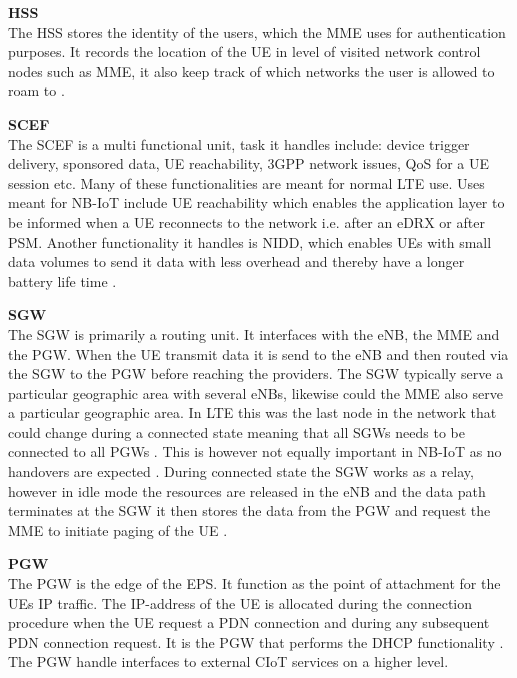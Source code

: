 \textbf{\gls{HSS}}\\
The \gls{HSS} stores the identity of the users, which the \gls{MME} uses for authentication purposes. It records the location of the \gls{UE} in level of visited network control nodes  such as \gls{MME}, it also keep track of which networks the user is allowed to roam to \citep[ch. 3]{book_LTE_for_UMTS}.

\textbf{\gls{SCEF}}\\
The \gls{SCEF} is a multi functional unit, task it handles include: device trigger delivery, sponsored data, \gls{UE} reachability, \gls{3GPP} network issues, \gls{QoS} for a \gls{UE} session etc. Many of these functionalities are meant for normal \gls{LTE} use. Uses meant for \gls{NB-IoT} include \gls{UE} reachability which enables the application layer to be informed when a \gls{UE} reconnects to the network i.e. after an \gls{eDRX} or after \gls{PSM}. Another functionality it handles is \gls{NIDD}, which enables \gls{UE}s with small data volumes to send it data with less overhead and thereby have a longer battery life time .

\textbf{\gls{SGW}}\\
The \gls{SGW} is primarily a routing unit. It interfaces with the \gls{eNB}, the \gls{MME} and the \gls{PGW}. When the \gls{UE} transmit data it is send to the \gls{eNB} and then routed via the \gls{SGW} to the \gls{PGW} before reaching the providers. The \gls{SGW} typically serve a particular geographic area with several \gls{eNB}s, likewise could the \gls{MME} also serve a particular geographic area. In \gls{LTE} this was the last node in the network that could change during a connected state meaning that all \gls{SGW}s needs to be connected to all \gls{PGW}s \citep[ch. 3]{book_LTE_for_UMTS}. This is however not equally important in \gls{NB-IoT} as no handovers are expected \citep{REL-13}. During connected state the \gls{SGW} works as a relay, however in idle mode the resources are released in the \gls{eNB} and the data path terminates at the \gls{SGW} it then stores the data from the \gls{PGW} and request the \gls{MME} to initiate paging of the \gls{UE} \citep[ch. 3]{book_LTE_for_UMTS}.

\textbf{\gls{PGW}}\\
The \gls{PGW} is the edge of the \gls{EPS}. It function as the point of attachment for the \gls{UE}s \gls{IP} traffic. The \gls{IP}-address of the \gls{UE} is allocated during the connection procedure when the \gls{UE} request a \gls{PDN} connection and during any subsequent \gls{PDN} connection request. It is the \gls{PGW} that performs the \gls{DHCP} functionality \citep[ch. 3]{book_LTE_for_UMTS}. The \gls{PGW} handle interfaces to external CIoT services on a higher level.

